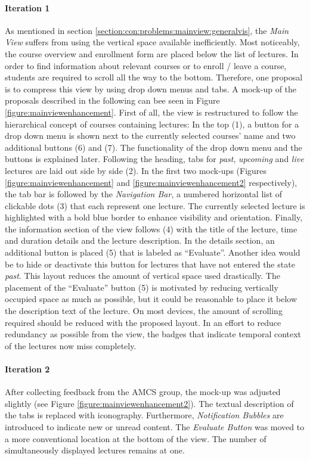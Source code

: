 \paragraph{Iteration 1}
As mentioned in section \ref{section:con:problems:mainview:generalvis}, the \emph{Main View} suffers from using the vertical space available inefficiently. Most noticeably, the course overview and enrollment form are placed below the list of lectures. In order to find information about relevant courses or to enroll / leave a course, students are required to scroll all the way to the bottom. 
Therefore, one proposal is to compress this view by using drop down menus and tabs. A mock-up of the proposals described in the following can bee seen in Figure \ref{figure:mainviewenhancement}. First of all, the view is restructured to follow the hierarchical concept of courses containing lectures: In the top (1), a button for a drop down menu is shown next to the currently selected courses' name and two additional buttons (6) and (7). The functionality of the drop down menu and the buttons is explained later.
Following the heading, tabs for \emph{past}, \emph{upcoming} and \emph{live} lectures are laid out side by side (2). In the first two mock-ups (Figures \ref{figure:mainviewenhancement} and \ref{figure:mainviewenhancement2} respectively), the tab bar is followed by the \emph{Navigation Bar}, a numbered horizontal list of clickable dots (3) that each represent one lecture. The currently selected lecture is highlighted with a bold blue border to enhance visibility and orientation. Finally, the information section of the view follows (4) with the title of the lecture, time and duration details and the lecture description. In the details section, an additional button is placed (5) that is labeled as “Evaluate”. Another idea would be to hide or deactivate this button for lectures that have not entered the state \emph{past}.
This layout reduces the amount of vertical space used drastically. The placement of the “Evaluate” button (5) is motivated by reducing vertically occupied space as much as possible, but it could be reasonable to place it below the description text of the lecture. On most devices, the amount of scrolling required should be reduced with the proposed layout. In an effort to reduce redundancy as possible from the view, the badges that indicate temporal context of the lectures now miss completely.

\paragraph{Iteration 2}
After collecting feedback from the AMCS group, the mock-up was adjusted slightly (see Figure \ref{figure:mainviewenhancement2}). The textual description of the tabs is replaced with iconography. Furthermore, \emph{Notification Bubbles} are introduced to indicate new or unread content. The \emph{Evaluate Button} was moved to a more conventional location at the bottom of the view. The number of simultaneously displayed lectures remains at one.

